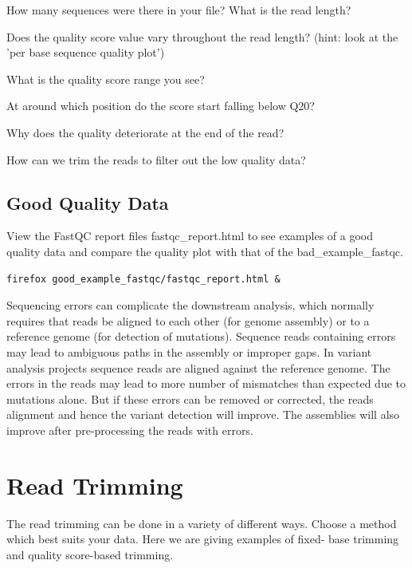 \begin{questions}
How many sequences were there in your file? What is the read length?

Does the quality score value vary throughout the read length?
(hint: look at the 'per base sequence quality plot')

What is the quality score range you see?

At around which position do the score start falling below Q20? 

Why does the quality deteriorate at the end of the read?

How can we trim the reads to filter out the low quality data?

\end{questions}

\begin{bonus}
\subsection{Good Quality Data}
View the FastQC report files fastqc\_report.html to see examples of a good
quality data and compare the quality plot with that of the bad\_example\_fastqc.

\begin{lstlisting}
firefox good_example_fastqc/fastqc_report.html &
\end{lstlisting}
\end{bonus}

\begin{note}
Sequencing errors can complicate the downstream analysis, which normally
requires that reads be aligned to each other (for genome assembly) or to a
reference genome (for detection of mutations). Sequence reads containing errors
may lead to ambiguous paths in the assembly or improper gaps. In variant
analysis projects sequence reads are aligned against the reference genome. The
errors in the reads may lead to more number of mismatches than expected due to
mutations alone. But if these errors can be removed or corrected, the reads
alignment and hence the variant detection will improve. The assemblies will also
improve after pre-processing the reads with errors.
\end{note}

\section{Read Trimming}
The read trimming can be done in a variety of different ways. Choose a method
which best suits your data. Here we are giving examples of fixed-  base trimming
and quality score-based trimming.

